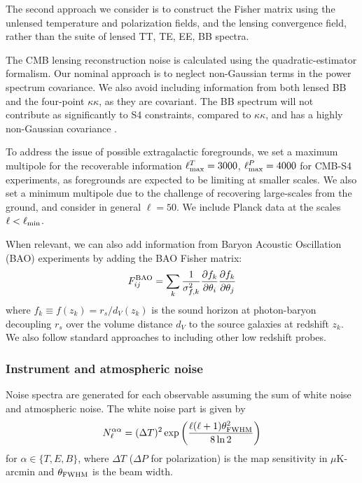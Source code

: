 The second approach we consider is to construct the Fisher matrix using the unlensed temperature and polarization fields, and the lensing convergence field, rather than the suite of lensed TT, TE, EE, BB spectra.

The CMB lensing reconstruction noise is calculated using the \cite{Hu:2002} quadratic-estimator formalism. Our nominal approach is to neglect non-Gaussian terms in the power spectrum covariance. We also avoid including information from both lensed BB and the four-point $\kappa \kappa$, as they are covariant. The BB spectrum will not contribute as significantly to S4 constraints, compared to $\kappa \kappa$, and has a highly non-Gaussian covariance \cite{Benoit-Levy:2012}. 

To address the issue of possible extragalactic foregrounds, we set a maximum multipole for the recoverable information $\ell^T_{\rm max} = 3000$, $\ell^P_{\rm max} = 4000$ for CMB-S4 experiments, as foregrounds are expected to be limiting at smaller scales. We also set a minimum multipole due to the challenge of recovering large-scales from the ground, and consider in general $\ell=50$. We include Planck data at the scales $\ell<\ell_{\rm min}$. 

When relevant, we can also add information from Baryon Acoustic Oscillation (BAO) experiments by adding the BAO Fisher matrix:
%
\begin{equation}
F_{ij}^{\rm BAO} = \sum_{k} \frac{1}{\sigma_{f,k}^2}\frac{\partial f_k}{\partial \theta_i}\frac{\partial f_k}{\partial \theta_j}
\end{equation}
%
where $f_k \equiv f(z_k) = r_s/d_V(z_k)$ is the sound horizon at photon-baryon decoupling $r_s$ over the volume distance $d_V$ to the source galaxies at redshift $z_k$. We also follow standard approaches to including other low redshift probes.

\subsubsection{Instrument and atmospheric noise}
Noise spectra are generated for each observable assuming the sum of white noise and atmospheric noise. The white noise part is given by
%
\begin{equation}
N^{\alpha \alpha}_\ell = (\Delta T)^2 \exp \left( \frac{\ell(\ell + 1) \theta^2_{\rm FWHM}}{8 \ln 2} \right)
\end{equation}
%
for $\alpha \in \{T, E, B\}$, where $\Delta T$ ($\Delta P$ for polarization) is the map sensitivity in $\mu$K-arcmin and $\theta_{\rm FWHM}$ is the beam width. 

